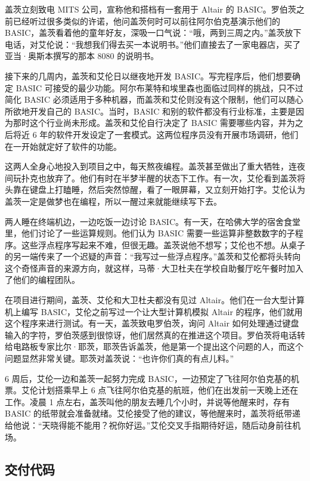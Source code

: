\documentclass[12pt,UTF8]{ctexbook}
\begin{document}
盖茨立刻致电 MITS 公司，宣称他和搭档有一套用于 Altair 的 BASIC。罗伯茨之前已经听过很多类似的许诺，他问盖茨何时可以前往阿尔伯克基演示他们的 BASIC，盖茨看着他的童年好友，深吸一口气说：“哦，两到三周之内。”盖茨放下电话，对艾伦说：“我想我们得去买一本说明书。”他们直接去了一家电器店，买了亚当·奥斯本撰写的那本 8080 的说明书。

接下来的几周内，盖茨和艾伦日以继夜地开发 BASIC。写完程序后，他们想要确定 BASIC 可接受的最少功能。阿尔布莱特和埃里森也面临过同样的挑战，只不过简化 BASIC 必须适用于多种机器，而盖茨和艾伦则没有这个限制，他们可以随心所欲地开发自己的 BASIC。当时，BASIC 和别的软件都没有行业标准，主要是因为那时这个行业尚未形成。盖茨和艾伦自行决定了 BASIC 需要哪些内容，并为之后将近 6 年的软件开发设定了一套模式。这两位程序员没有开展市场调研，他们在一开始就定好了软件的功能。

这两人全身心地投入到项目之中，每天熬夜编程。盖茨甚至做出了重大牺牲，连夜间玩扑克也放弃了。他们有时在半梦半醒的状态下工作。有一次，艾伦看到盖茨将头靠在键盘上打瞌睡，然后突然惊醒，看了一眼屏幕，又立刻开始打字。艾伦认为盖茨一定是做梦也在编程，所以一醒过来就能继续写下去。

两人睡在终端机边，一边吃饭一边讨论 BASIC。有一天，在哈佛大学的宿舍食堂里，他们讨论了一些运算规则。他们认为 BASIC 需要一些运算非整数数字的子程序。这些浮点程序写起来不难，但很无趣。盖茨说他不想写；艾伦也不想。从桌子的另一端传来了一个迟疑的声音：“我写过一些浮点程序。”盖茨和艾伦都将头转向这个奇怪声音的来源方向，就这样，马蒂·大卫杜夫在学校自助餐厅吃午餐时加入了他们的编程团队。

在项目进行期间，盖茨、艾伦和大卫杜夫都没有见过 Altair。他们在一台大型计算机上编写 BASIC，艾伦之前写过一个让大型计算机模拟 Altair 的程序，他们就用这个程序来进行测试。有一天，盖茨致电罗伯茨，询问 Altair 如何处理通过键盘输入的字符，罗伯茨感到很惊讶，他们居然真的在推进这个项目。罗伯茨将电话转给电路板专家比尔·耶茨，耶茨告诉盖茨，他是第一个提出这个问题的人，而这个问题显然非常关键。耶茨对盖茨说：“也许你们真的有点儿料。”

6 周后，艾伦一边和盖茨一起努力完成 BASIC，一边预定了飞往阿尔伯克基的机票。艾伦计划搭乘早上 6 点飞往阿尔伯克基的航班，他们在出发前一天晚上还在工作。凌晨 1 点左右，盖茨叫他的朋友去睡几个小时，并说等他醒来时，存有 BASIC 的纸带就会准备就绪。艾伦接受了他的建议，等他醒来时，盖茨将纸带递给他说：“天晓得能不能用？祝你好运。”艾伦交叉手指期待好运，随后动身前往机场。





\subsection{交付代码}
\end{document}
